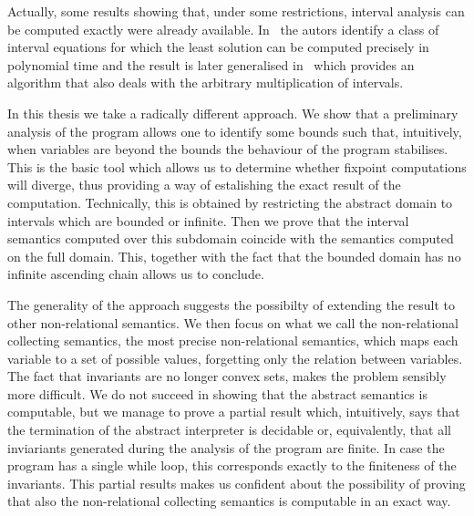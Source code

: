 Actually, some results showing that, under some restrictions, interval
analysis can be computed exactly were already
available. In~\cite{SU2005122} the autors identify a class of interval
equations for which the least solution can be computed precisely in
polynomial time and the result is later generalised
in~\cite{Gawlitza2009} which provides an algorithm that also deals
with the arbitrary multiplication of intervals.

In this thesis we take a radically different approach. We show that a
preliminary analysis of the program allows one to identify some bounds
such that, intuitively, when variables are beyond the bounds the
behaviour of the program stabilises. This is the basic tool which
allows us to determine whether fixpoint computations will diverge,
thus providing a way of estalishing the exact result of the
computation. Technically, this is obtained by restricting the abstract
domain to intervals which are bounded or infinite. Then we prove that
the interval semantics computed over this subdomain coincide with the
semantics computed on the full domain. This, together with the fact
that the bounded domain has no infinite ascending chain allows us to
conclude.

The generality of the approach suggests the possibilty of extending
the result to other non-relational semantics. We then focus on what we
call the non-relational collecting semantics, the most precise
non-relational semantics, which maps each variable to a set of
possible values, forgetting only the relation between variables. The
fact that invariants are no longer convex sets, makes the problem
sensibly more difficult. We do not succeed in showing that the
abstract semantics is computable, but we manage to prove a partial
result which, intuitively, says that the termination of the abstract
interpreter is decidable or, equivalently, that all inviariants
generated during the analysis of the program are finite. In case the
program has a single while loop, this corresponds exactly to the
finiteness of the invariants. This partial results makes us confident
about the possibility of proving that also the non-relational
collecting semantics is computable in an exact way.

